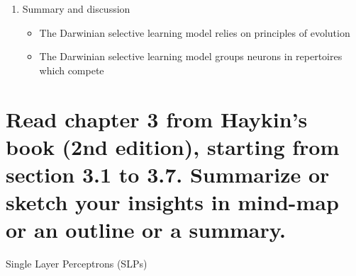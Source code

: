 \documentclass{scrartcl}
\begin{document}
\begin{enumerate}
\item Summary and discussion
	\begin{itemize}
	\item The Darwinian selective learning model relies on principles of evolution
	\item The Darwinian selective learning model groups neurons in repertoires which compete
	\end{itemize}
\end{enumerate}



\section{Read chapter 3 from Haykin’s book (2nd edition), starting from section 3.1 to 3.7.
Summarize or sketch your insights in mind-map or an outline or a summary.
}
Single Layer Perceptrons (SLPs)
\end{document}
